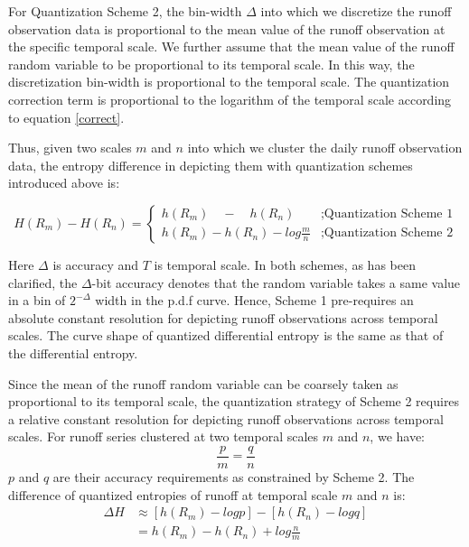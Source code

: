 \documentclass[11pt]{article}
\begin{document}
For Quantization Scheme 2,  the bin-width $\Delta$ into which we discretize the runoff observation data is proportional to the mean value of the runoff observation at the specific temporal scale. We further assume that the mean value of the runoff random variable to be proportional to its temporal scale. In this way, the discretization bin-width is proportional to the temporal scale. The quantization correction term is proportional to the logarithm of the temporal scale according to equation \ref{correct}.

Thus, given two scales $m$ and $n$ into which we cluster the daily runoff observation data, the entropy difference in depicting them with quantization schemes introduced above is:

\begin{equation}
H(R_m)-H(R_n)=\left\{
\begin{array}{rl}
h(R_m)\quad-\quad h(R_n)&;\text{Quantization Scheme 1}\\
h(R_m)-h(R_n)-log\frac{m}{n}&;\text{Quantization Scheme 2} 
\end{array}
\right.
\end{equation} 



\iffalse
Here $\Delta$ is accuracy and $T$ is temporal scale.
In both schemes, as has been clarified, the $\Delta$-bit accuracy denotes that the random variable takes a same value in a bin of $2^{-\Delta}$ width in the p.d.f curve.  Hence, Scheme 1 pre-requires an absolute constant resolution for depicting runoff observations across temporal scales. The curve shape of quantized differential entropy is the same as that of the differential entropy. 

Since the mean of the runoff random variable can be coarsely taken as proportional to its temporal scale, the quantization strategy of Scheme 2 requires a relative constant resolution for depicting runoff observations across temporal scales. For runoff series clustered at two temporal scales $m$ and $n$, we have:
\begin{equation}
\frac{p}{m}=\frac{q}{n}
\end{equation}
$p$ and $q$ are their accuracy requirements as constrained by Scheme 2. The difference of  quantized entropies of runoff at temporal scale $m$ and $n$ is:
 \begin{equation}
\begin{split}
\Delta H &\approx [h(R_m)-logp]-[h(R_n)-logq]\\
&=h(R_m)-h(R_n)+log\frac{n}{m} 
\end{split}
\end{equation}
\end{document}
